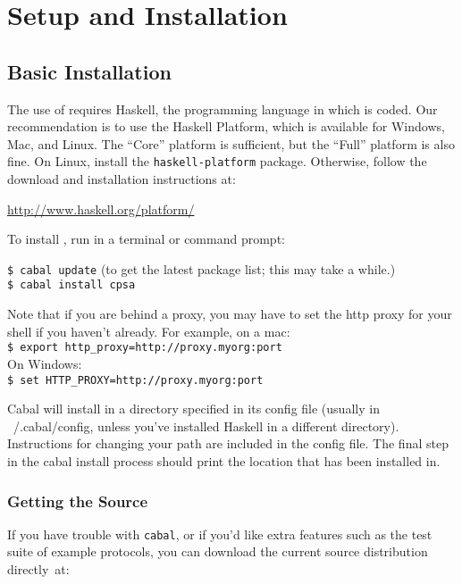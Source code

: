 \chapter{Setup and Installation}
\label{ch:setup}

\section{Basic Installation}

The use of {\cpsa} requires Haskell, the programming language in which
{\cpsa} is coded.  Our recommendation is to use the Haskell Platform,
which is available for Windows, Mac, and Linux.  The ``Core'' platform
is sufficient, but the ``Full'' platform is also fine.  On Linux,
install the \texttt{haskell-platform} package.  Otherwise, follow the
download and installation instructions at:

\begin{center}
\url{http://www.haskell.org/platform/}
\end{center}

To install {\cpsa}, run in a terminal or command prompt:

\noindent \texttt{\$ cabal update} (to get the latest package list; this may take a while.)\\
\texttt{\$ cabal install cpsa}

Note that if you are behind a proxy, you may have to set the http
proxy for your shell if you haven't already. For example, on a mac:\\
\texttt{\$ export http\_proxy=http://proxy.myorg:port}\\
On Windows:\\
\texttt{\$ set HTTP\_PROXY=http://proxy.myorg:port}

Cabal will install {\cpsa} in a directory specified in its config file
(usually in ~/.cabal/config, unless you've installed Haskell in a
different directory). Instructions for changing your path are included
in the config file. The final step in the cabal install process should
print the location that {\cpsa} has been installed in.

\subsection{Getting the Source}
If you have trouble with \texttt{cabal}, or if you'd like extra
features such as the {\cpsa} test suite of example protocols, you can
download the current source distribution directly~at:

